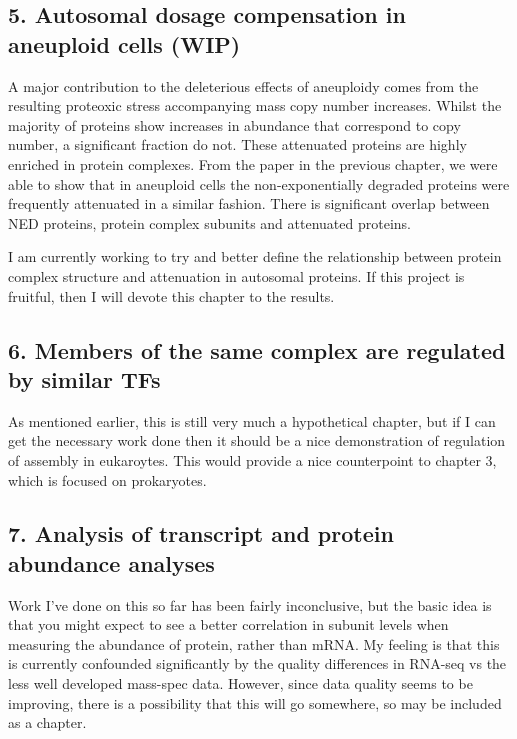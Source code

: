 \documentclass{article}
\begin{document}
\subsection*{5. Autosomal dosage compensation in aneuploid cells (WIP)}
A major contribution to the deleterious effects of aneuploidy comes from the resulting proteoxic stress accompanying mass copy number increases. Whilst the majority of proteins show increases in abundance that correspond to copy number, a significant fraction do not. These attenuated proteins are highly enriched in protein complexes. From the paper in the previous chapter, we were able to show that in aneuploid cells the non-exponentially degraded proteins were frequently attenuated in a similar fashion. There is significant overlap between NED proteins, protein complex subunits and attenuated proteins.

I am currently working to try and better define the relationship between protein complex structure and attenuation in autosomal proteins. If this project is fruitful, then I will devote this chapter to the results.

\subsection*{6. Members of the same complex are regulated by similar TFs}
As mentioned earlier, this is still very much a hypothetical chapter, but if I can get the necessary work done then it should be a nice demonstration of regulation of assembly in eukaroytes. This would provide a nice counterpoint to chapter 3, which is focused on prokaryotes.

\subsection*{7. Analysis of transcript and protein abundance analyses}
Work I've done on this so far has been fairly inconclusive, but the basic idea is that you might expect to see a better correlation in subunit levels when measuring the abundance of protein, rather than mRNA. My feeling is that this is currently confounded significantly by the quality differences in RNA-seq vs the less well developed mass-spec data. However, since data quality seems to be improving, there is a possibility that this will go somewhere, so may be included as a chapter.
\end{document}
